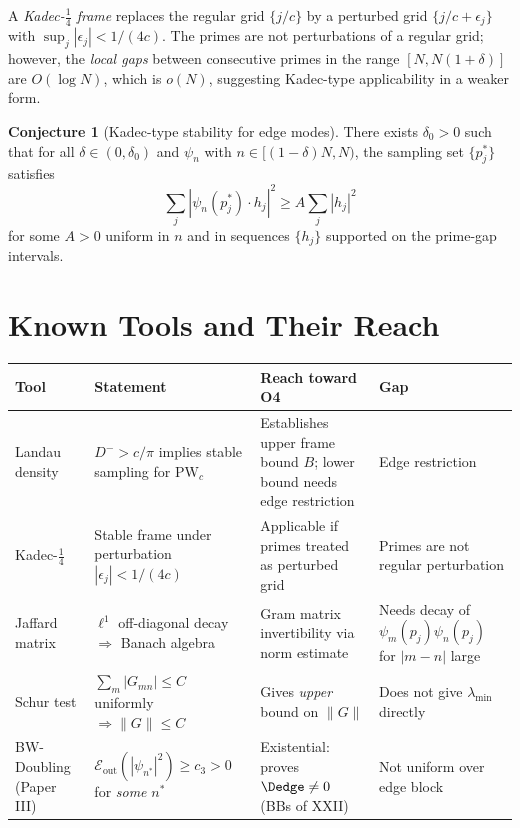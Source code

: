 \documentclass[12pt,a4paper]{amsart}
\theoremstyle{definition}
\newtheorem{conjecture}[theorem]{Conjecture}
\newcommand{\PW}{\mathrm{PW}_c}
\begin{document}
A \emph{Kadec-$\tfrac{1}{4}$ frame} replaces the regular grid
$\{j/c\}$ by a perturbed grid $\{j/c + \epsilon_j\}$
with $\sup_j|\epsilon_j| < 1/(4c)$.
The primes are not perturbations of a regular grid;
however, the \emph{local gaps} between consecutive primes
in the range $[N, N(1+\delta)]$ are $O(\log N)$,
which is $o(N)$, suggesting Kadec-type applicability
in a weaker form.

\begin{conjecture}[Kadec-type stability for edge modes]%
\label{conj:kadec_edge}
There exists $\delta_0 > 0$ such that for all
$\delta \in (0,\delta_0)$ and $\psi_n$ with
$n \in [(1-\delta)N, N)$, the sampling set $\{p_j^*\}$
satisfies
\[
  \sum_j |\psi_n(p_j^*)\cdot h_j|^2
  \ge A \sum_j |h_j|^2
\]
for some $A > 0$ uniform in $n$ and in sequences
$\{h_j\}$ supported on the prime-gap intervals.
\end{conjecture}

\section{Known Tools and Their Reach}
\label{sec:tools}

\begin{center}
\renewcommand{\arraystretch}{1.3}
\begin{tabular}{l p{4cm} p{4.5cm} l}
\toprule
\textbf{Tool} & \textbf{Statement} & \textbf{Reach toward O4} & \textbf{Gap} \\
\midrule
Landau density
  & $D^- > c/\pi$ implies stable sampling for $\PW$
  & Establishes upper frame bound $B$;
    lower bound needs edge restriction
  & Edge restriction \\
Kadec-$\tfrac{1}{4}$
  & Stable frame under perturbation $|\epsilon_j| < 1/(4c)$
  & Applicable if primes treated as perturbed grid
  & Primes are not regular perturbation \\
Jaffard matrix
  & $\ell^1$ off-diagonal decay $\Rightarrow$ Banach algebra
  & Gram matrix invertibility via norm estimate
  & Needs decay of $\psi_m(p_j)\psi_n(p_j)$ for $|m-n|$ large \\
Schur test
  & $\sum_m |G_{mn}| \le C$ uniformly $\Rightarrow \|G\| \le C$
  & Gives \emph{upper} bound on $\|G\|$
  & Does not give $\lambda_{\min}$ directly \\
BW-Doubling (Paper III)
  & $\mathcal{E}_{\mathrm{out}}(|\psi_{n^*}|^2) \ge c_3 > 0$
    for \emph{some} $n^*$
  & Existential: proves $\Dedge \ne 0$ (BBs of XXII)
  & Not uniform over edge block \\
\bottomrule
\end{tabular}
\end{center}
\end{document}
